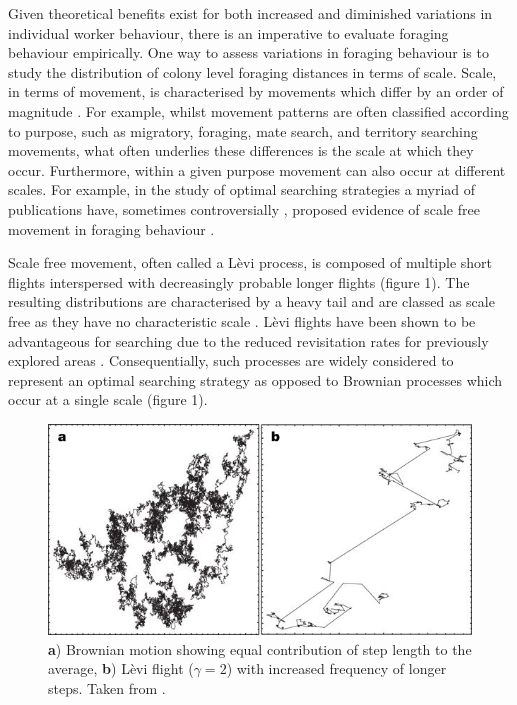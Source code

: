 \documentclass[11pt,usenames,dvipsnames]{article}
\begin{document}
\begin{linenumbers}
Given theoretical benefits exist for both increased and diminished variations in individual worker behaviour, there is an imperative to evaluate foraging behaviour empirically. One way to assess variations in foraging behaviour is to study the distribution of colony level foraging distances in terms of scale. Scale, in terms of movement, is characterised by movements which differ by an order of magnitude \citep{Levin1992}. For example, whilst movement patterns are often classified according to purpose, such as migratory, foraging, mate search, and territory searching movements, what often underlies these differences is the scale at which they occur. Furthermore, within a given purpose movement can also occur at different scales. For example, in the study of optimal searching strategies a myriad of publications have, sometimes controversially \citep{Viswanathan1996}, proposed evidence of scale free movement in foraging behaviour \citep{Harris2012, Ariel2015, Humphries2010, Baronchelli2013, Boyer, Ayala-Orozco2004, Sims2008, Viswanathan1999}.

Scale free movement, often called a L\`evi process, is composed of multiple short flights interspersed with decreasingly probable longer flights (figure 1). The resulting distributions are characterised by a heavy tail and are classed as scale free as they have no characteristic scale \citep{Reynolds2018}. L\`evi flights have been shown to be advantageous for searching due to the reduced revisitation rates for previously explored areas \citep{Viswanathan1999}. Consequentially, such processes are widely considered to represent an optimal searching strategy \citep{Viswanathan1999,Humphries2014} as opposed to Brownian processes which occur at a single scale (figure 1).
\end{linenumbers}

\begin{figure}[H]
	\centering
	\includegraphics[scale=0.7]{LeviFlight.jpg}
	\caption{\textbf{a}) Brownian motion showing equal contribution of step length to the average, \textbf{b}) L\`evi flight ($\gamma = 2$) with increased frequency of longer steps. Taken from \cite{Barthelemy2008}.}
\end{figure}
\end{document}
